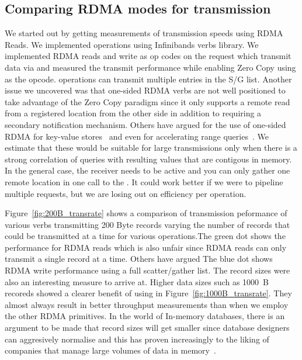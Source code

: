 \subsection{Comparing RDMA modes for transmission}
We started out by getting measurements of transmission speeds using RDMA Reads.
We implemented operations using Infinibands verbs library. We implemented 
RDMA reads and write as op codes on the  request which 
transmit data via  and measured the transmit 
performance while enabling Zero Copy using  as the opcode.
 operations can transmit multiple entries in the S/G list.
Another issue we uncovered was that one-sided RDMA verbs are not well positioned to 
take advantage of the Zero Copy paradigm since it only supports a remote read 
from a registered location from the other side in addition to requiring a secondary notification mechanism.
Others have argued for the use of one-sided RDMA for key-value stores~\cite{pilaf} and even for accelerating 
range queries~\cite{zerocopyrangequery}. We estimate that these would be suitable for large transmissions only when there is a strong 
correlation of queries with resulting values that are contigous in memory. In the general case, the receiver 
needs to be active and you can  only gather one remote location in one call to the .
It could work better if we were to pipeline multiple requests, but we are losing out on efficiency per operation.

Figure~\ref{fig:200B_transrate} shows a comparison of transmission
peformance of various verbs transmitting 200 Byte records varying the number of records
that could be transmitted at a time for various operations.The green dot shows
the performance for RDMA reads which is also unfair
since RDMA reads can only transmit a single record at a time. Others have argued The blue dot
shows RDMA write performance using a full scatter/gather list. The record sizes were 
also an interesting measure to arrive at. Higher data sizes such as 1000~B recoreds showed a clearer benefit of using  in Figure~\ref{fig:1000B_transrate}.
They almost always result in better throughput measurements than when we employ the other RDMA primitives.
In the world of In-memory databases,
there is an argument to be made that record sizes will get smaller since 
database designers can aggresively normalise and this has proven increasingly to
the liking of companies that manage large volumes of data in memory~\cite{fb-memcache,fb-workload,inmemoryworkload}.
\clearpage




